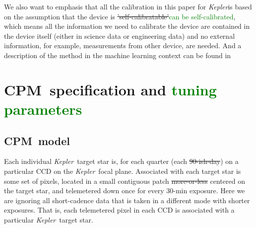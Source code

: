 \documentclass[12pt, preprint]{aastex}
\newcommand{\project}[1]{\textsl{#1}}
\newcommand{\Kepler}{\project{Kepler}}
\newcommand{\name}{CPM}
\newcommand{\revise}[1]{\textcolor{green}{#1}}
\newcommand{\remove}[1]{\sout{#1}}
\begin{document}
We also want to emphasis that all the calibration in this paper for \Kepler is 
  based on the assumption that the device is \remove{'self-calibratable'}\revise{can be self-calibrated}, 
  which means all the information we need to calibrate the device are contained in the device itself 
  (either in science data or engineering data) and no external information, 
  for example, measurements from other device, are needed.
  And a description of the method in the machine learning context can be found in \cite{icml2015}

\section{\name\ specification and \revise{tuning parameters}}
\subsection{\name\ model}
Each individual \Kepler\ target star is, for each quarter (each \remove{90-ish-day})
  on a particular CCD on the \Kepler\ focal plane.
Associated with each target star is some set of pixels,
  located in a small contiguous patch \remove{more-or-less} centered on the target star,
  and telemetered down once for every 30-min exposure.
Here we are ignoring all short-cadence data that is taken in a different mode with shorter exposures.
That is, each telemetered pixel in each CCD is associated with a particular \Kepler\ target star.
\end{document}
